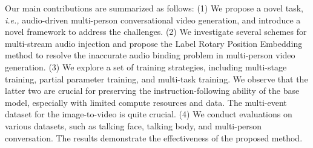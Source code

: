 \documentclass{article}
\begin{document}

Our main contributions are summarized as follows:
(1) We propose a novel task, \textit{i.e.,} audio-driven multi-person conversational video generation, and introduce a novel framework to address the challenges.
(2) We investigate several schemes for multi-stream audio injection and propose the Label Rotary Position Embedding method to resolve the inaccurate audio binding problem in multi-person video generation.
(3) We explore a set of training strategies, including multi-stage training, partial parameter training, and multi-task training. We observe that the latter two are crucial for preserving the instruction-following ability of the base model, especially with limited compute resources and data. The multi-event dataset for the image-to-video is quite crucial.  
(4) We conduct evaluations on various datasets, such as talking face, talking body, and multi-person conversation. The results demonstrate the effectiveness of the proposed method.
\end{document}
